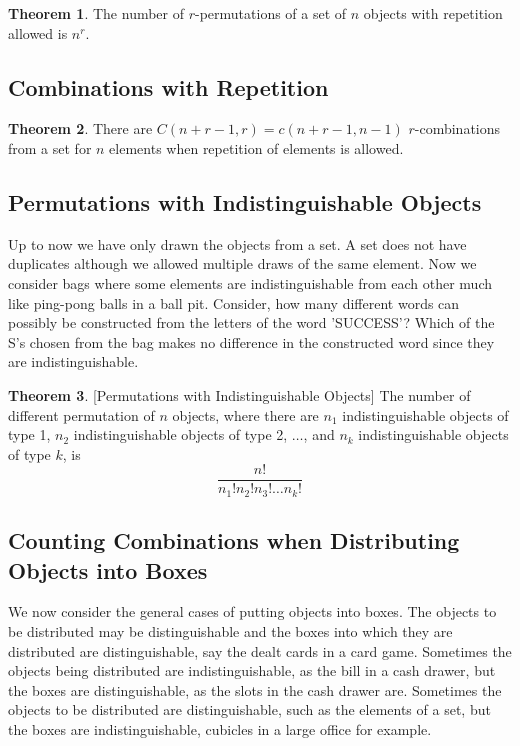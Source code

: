 \documentclass[11pt]{book} %
\theoremstyle {definition}
\newtheorem {theorem}{Theorem}[section]
\theoremstyle {remark}
\begin{document}
\begin{theorem}
The number of $r$-permutations of a set of $n$ objects with repetition allowed is $n^r$.
\end{theorem}


    \subsection {Combinations with Repetition}
\begin{theorem} 
There are $C(n+r-1,r) = c(n+r-1,n-1)$  $r$-combinations from a set for $n$ elements when repetition of elements is allowed.
\end{theorem} 



    \subsection {Permutations with Indistinguishable Objects}
Up to now we have only drawn the objects from a set. A set does not have duplicates although we allowed multiple draws of the same element. Now we consider bags where some elements are indistinguishable from each other much like ping-pong balls in a ball pit. Consider, how many different words can possibly be constructed from the letters of the word 'SUCCESS'? Which of the S's chosen from the bag makes no difference in the constructed word since they are indistinguishable.
\begin{theorem}\label{PermDistinguishedBoxesIndistinguishableObjects}[Permutations with Indistinguishable Objects]
The number of different permutation of $n$ objects, where there are $n_1$ indistinguishable objects of type 1, $n_2$ indistinguishable objects of type 2,  $\dots$, and $n_k$ indistinguishable objects of type $k$, is 
$$\frac{n!}{n_1! n_2! n_3! \dots n_k!}$$
\end{theorem}

    \subsection {Counting Combinations when Distributing Objects into Boxes}
We now consider the general cases of putting objects into boxes. The objects to be distributed may be distinguishable and the boxes into which they are distributed are distinguishable, say the dealt cards in a card game. Sometimes the objects being distributed are indistinguishable, as the bill in a cash drawer, but the boxes are distinguishable, as the slots in the cash drawer are. Sometimes the objects to be distributed are distinguishable, such as the elements of a set, but the boxes are indistinguishable, cubicles in a large office for example. 
\end{document}
